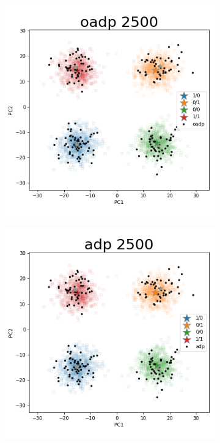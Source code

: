 \documentclass{article}
\begin{document}
\begin{figure}
\begin{subfigure}{.5\textwidth}
\end{subfigure}
\hfill
\begin{subfigure}{.5\textwidth}
  \centering
  \includegraphics[width=.98\linewidth]{img/ggsim2500_100000_200_2_1_100_1_sturef_ggsim2500_100000_2500_2_1_100_0_oadp}
\end{subfigure}%
\begin{subfigure}{.5\textwidth}
  \centering
  \includegraphics[width=.98\linewidth]{img/ggsim2500_100000_200_2_1_100_1_sturef_ggsim2500_100000_2500_2_1_100_0_adp}
\end{subfigure}
\end{figure}
\end{document}
